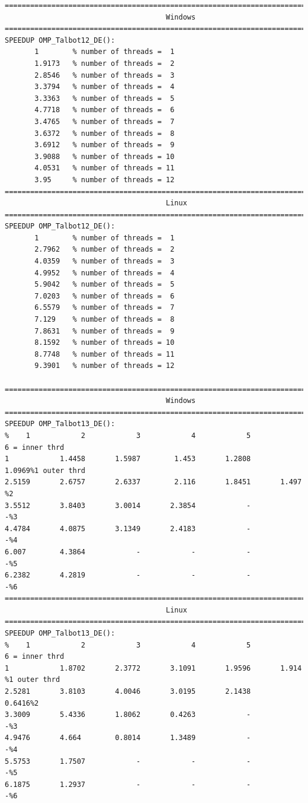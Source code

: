 \documentclass[a4paper,10pt]{report}%
\begin{document}
\begin{lstlisting}
====================================================================================
                                      Windows
====================================================================================
SPEEDUP OMP_Talbot12_DE():
       1        % number of threads =  1
       1.9173   % number of threads =  2
       2.8546   % number of threads =  3
       3.3794   % number of threads =  4
       3.3363   % number of threads =  5
       4.7718   % number of threads =  6
       3.4765   % number of threads =  7
       3.6372   % number of threads =  8
       3.6912   % number of threads =  9
       3.9088   % number of threads = 10
       4.0531   % number of threads = 11
       3.95     % number of threads = 12
====================================================================================
                                      Linux
====================================================================================
SPEEDUP OMP_Talbot12_DE():
       1        % number of threads =  1
       2.7962   % number of threads =  2
       4.0359   % number of threads =  3
       4.9952   % number of threads =  4
       5.9042   % number of threads =  5
       7.0203   % number of threads =  6
       6.5579   % number of threads =  7
       7.129    % number of threads =  8
       7.8631   % number of threads =  9
       8.1592   % number of threads = 10
       8.7748   % number of threads = 11
       9.3901   % number of threads = 12

====================================================================================
                                      Windows
====================================================================================
SPEEDUP OMP_Talbot13_DE():
%    1            2            3            4            5            6 = inner thrd
1            1.4458       1.5987        1.453       1.2808       1.0969%1 outer thrd
2.5159       2.6757       2.6337        2.116       1.8451       1.497 %2
3.5512       3.8403       3.0014       2.3854            -            -%3
4.4784       4.0875       3.1349       2.4183            -            -%4
6.007        4.3864            -            -            -            -%5
6.2382       4.2819            -            -            -            -%6
====================================================================================
                                      Linux
====================================================================================
SPEEDUP OMP_Talbot13_DE():
%    1            2            3            4            5            6 = inner thrd
1            1.8702       2.3772       3.1091       1.9596       1.914 %1 outer thrd
2.5281       3.8103       4.0046       3.0195       2.1438       0.6416%2
3.3009       5.4336       1.8062       0.4263            -            -%3
4.9476       4.664        0.8014       1.3489            -            -%4
5.5753       1.7507            -            -            -            -%5
6.1875       1.2937            -            -            -            -%6
\end{lstlisting}
\end{document}
